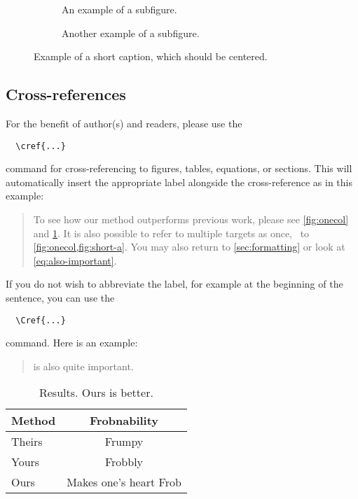 \documentclass[10pt,twocolumn,letterpaper]{article}
\begin{document}
\begin{figure*}
  \centering
  \begin{subfigure}{0.68\linewidth}
    \fbox{\rule{0pt}{2in} \rule{.9\linewidth}{0pt}}
    \caption{An example of a subfigure.}
    \label{fig:short-a}
  \end{subfigure}
  \hfill
  \begin{subfigure}{0.28\linewidth}
    \fbox{\rule{0pt}{2in} \rule{.9\linewidth}{0pt}}
    \caption{Another example of a subfigure.}
    \label{fig:short-b}
  \end{subfigure}
  \caption{Example of a short caption, which should be centered.}
  \label{fig:short}
\end{figure*}


\subsection{Cross-references}

For the benefit of author(s) and readers, please use the
{\small\begin{verbatim}
  \cref{...}
\end{verbatim}}  command for cross-referencing to figures, tables, equations, or sections.
This will automatically insert the appropriate label alongside the cross-reference as in this example:
\begin{quotation}
  To see how our method outperforms previous work, please see \cref{fig:onecol} and \cref{tab:example}.
  It is also possible to refer to multiple targets as once, \eg~to \cref{fig:onecol,fig:short-a}.
  You may also return to \cref{sec:formatting} or look at \cref{eq:also-important}.
\end{quotation}
If you do not wish to abbreviate the label, for example at the beginning of the sentence, you can use the
{\small\begin{verbatim}
  \Cref{...}
\end{verbatim}}
command. Here is an example:
\begin{quotation}
   is also quite important.
\end{quotation}



\begin{table}
  \centering
  \begin{tabular}{@{}lc@{}}
    \toprule
    Method & Frobnability \\
    \midrule
    Theirs & Frumpy \\
    Yours & Frobbly \\
    Ours & Makes one's heart Frob\\
    \bottomrule
  \end{tabular}
  \caption{Results.   Ours is better.}
  \label{tab:example}
\end{table}
\end{document}
